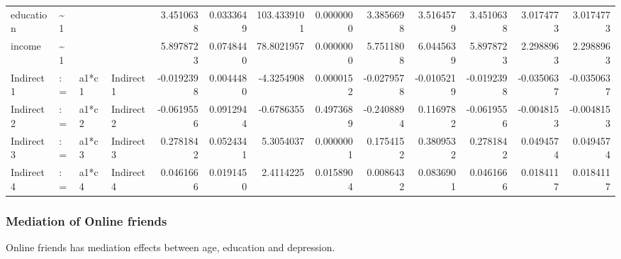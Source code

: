\documentclass[
]{article}
\begin{document}
\begin{table}[!h]
\begin{tabular}[t]{llllrrrrrrrrr}
\addlinespace
education & \textasciitilde{}1 &  &  & 3.4510638 & 0.0333649 & 103.4339101 & 0.0000000 & 3.3856698 & 3.5164579 & 3.4510638 & 3.0174773 & 3.0174773\\
income & \textasciitilde{}1 &  &  & 5.8978723 & 0.0748440 & 78.8021957 & 0.0000000 & 5.7511808 & 6.0445639 & 5.8978723 & 2.2988963 & 2.2988963\\
Indirect1 & := & a1*c1 & Indirect1 & -0.0192398 & 0.0044480 & -4.3254908 & 0.0000152 & -0.0279578 & -0.0105219 & -0.0192398 & -0.0350637 & -0.0350637\\
Indirect2 & := & a1*c2 & Indirect2 & -0.0619556 & 0.0912944 & -0.6786355 & 0.4973689 & -0.2408894 & 0.1169782 & -0.0619556 & -0.0048153 & -0.0048153\\
Indirect3 & := & a1*c3 & Indirect3 & 0.2781842 & 0.0524341 & 5.3054037 & 0.0000001 & 0.1754152 & 0.3809532 & 0.2781842 & 0.0494574 & 0.0494574\\
\addlinespace
Indirect4 & := & a1*c4 & Indirect4 & 0.0461666 & 0.0191450 & 2.4114225 & 0.0158904 & 0.0086432 & 0.0836901 & 0.0461666 & 0.0184117 & 0.0184117\\
\bottomrule
\end{tabular}
\end{table}

\newpage

\hypertarget{mediation-of-online-friends}{%
\subsubsection{Mediation of Online
friends}\label{mediation-of-online-friends}}

Online friends has mediation effects between age, education and
depression.
\end{document}
